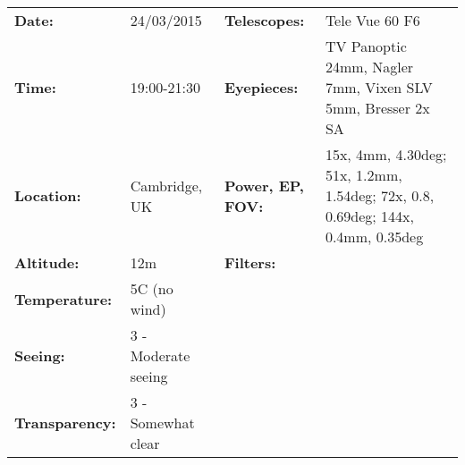 \begin{tabular}{ p{0.9in} p{1.3in} p{1.2in} p{5.2in}}
{\bf Date:} & 24/03/2015 & {\bf Telescopes:} & Tele Vue 60 F6 \\ 
{\bf Time:} & 19:00-21:30 & {\bf Eyepieces:} & TV Panoptic 24mm, Nagler 7mm, Vixen SLV 5mm, Bresser 2x SA \\ 
{\bf Location:} & Cambridge, UK & {\bf Power, EP, FOV:} & 15x, 4mm, 4.30deg; 51x, 1.2mm, 1.54deg; 72x, 0.8, 0.69deg; 144x, 0.4mm, 0.35deg \\ 
{\bf Altitude:} & 12m & {\bf Filters:} &  \\ 
{\bf Temperature:} & 5C (no wind) & & \\ 
{\bf Seeing:} & 3 - Moderate seeing & & \\ 
{\bf Transparency:} & 3 - Somewhat clear & & \\ 
\end{tabular}
\centering 
